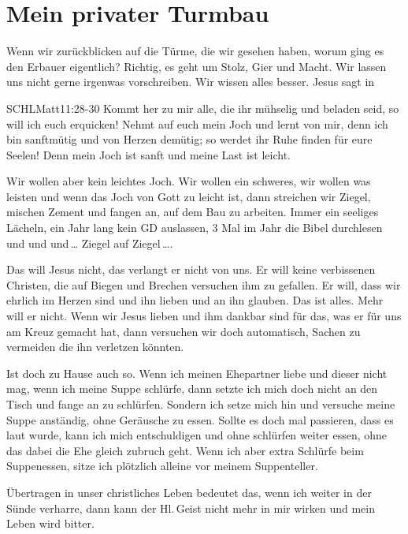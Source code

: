 \documentclass[12pt]{../../inc/mybib}
\newenvironment{block}[1][]{%
  \vspace{1.5em}%
  \noindent\textbf{#1}\par%
  \vspace{0.0em}%
}{%
  \vspace{1em}%
}
\begin{document}
    \section{Mein privater Turmbau}
\begin{block}
    Wenn wir zurückblicken auf die Türme, die wir gesehen haben, worum ging es den Erbauer eigentlich? Richtig, es geht um Stolz, Gier und Macht. Wir lassen uns nicht gerne irgenwas vorschreiben. Wir wissen alles besser. Jesus sagt in  
    \begin{bibelbox}{SCHL}{Matt}{11:28-30}
        Kommt her zu mir alle, die ihr mühselig und beladen seid, so will ich euch erquicken!
        Nehmt auf euch mein Joch und lernt von mir, denn ich bin sanftmütig und von Herzen demütig; so werdet ihr Ruhe finden für eure Seelen!
        Denn mein Joch ist sanft und meine Last ist leicht.
    \end{bibelbox}  
    Wir wollen aber kein leichtes Joch. Wir wollen ein schweres, wir wollen was leisten und wenn das Joch von Gott zu leicht ist, dann streichen wir Ziegel, mischen Zement und fangen an, auf dem Bau zu arbeiten. Immer ein seeliges Lächeln, ein Jahr lang kein GD auslassen, 3 Mal im Jahr die Bibel durchlesen und und und\,\dots{} Ziegel auf Ziegel\,\dots{}.
\end{block}
\begin{block}
    Das will Jesus nicht, das verlangt er nicht von uns. Er will keine verbissenen Christen, die auf Biegen und Brechen versuchen ihm zu gefallen. Er will, dass wir ehrlich im Herzen sind und ihn lieben und an ihn glauben. Das ist alles. Mehr will er nicht. Wenn wir Jesus lieben und ihm dankbar sind für das, was er für uns am Kreuz gemacht hat, dann versuchen wir doch automatisch, Sachen zu vermeiden die ihn verletzen könnten. 
    
    Ist doch zu Hause auch so. Wenn ich meinen Ehepartner liebe und dieser nicht mag, wenn ich meine Suppe schlürfe, dann setzte ich mich doch nicht an den Tisch und fange an zu schlürfen. Sondern ich setze mich hin und versuche meine Suppe anständig, ohne Geräusche zu essen. Sollte es doch mal passieren, dass es laut wurde, kann ich mich entschuldigen und ohne schlürfen weiter essen, ohne das dabei die Ehe gleich zubruch geht. Wenn ich aber extra Schlürfe beim Suppenessen, sitze ich plötzlich alleine vor meinem Suppenteller.

    Übertragen in unser christliches Leben bedeutet das, wenn ich weiter in der Sünde verharre, dann kann der Hl.\,Geist nicht mehr in mir wirken und mein Leben wird bitter.
\end{block}
\end{document}
